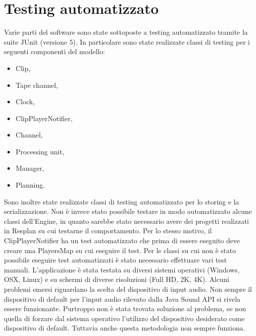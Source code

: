 \documentclass[a4paper,12pt]{report}
\begin{document}
\section{Testing automatizzato}
Varie parti del software sono state sottoposte a testing automatizzato tramite la suite JUnit (versione 5).
In particolare sono state realizzate classi di testing per i seguenti componenti del modello:
\begin{itemize}
    \item Clip,
    \item Tape channel,
    \item Clock,
    \item ClipPlayerNotifier,
    \item Channel,
    \item Processing unit,
    \item Manager,
    \item Planning.
\end{itemize}
Sono inoltre state realizzate classi di testing automatizzato per lo storing e la serializzazione.
Non è invece stato possibile testare in modo automatizzato alcune classi dell’Engine, in quanto sarebbe stato necessario avere dei progetti realizzati in Resplan su cui testarne il comportamento. 
Per lo stesso motivo, il ClipPlayerNotifier ha un test automatizzato che prima di essere eseguito deve creare una PlayersMap su cui eseguire il test.
Per le classi su cui non è stato possibile eseguire test automatizzati è stato necessario effettuare vari test manuali.
L’applicazione è stata testata su diversi sistemi operativi (Windows, OSX, Linux) e su schermi di diverse risoluzioni (Full HD, 2K, 4K).
Alcuni problemi emersi riguardano la scelta del dispositivo di input audio. Non sempre il dispositivo di default per l’input audio rilevato dalla Java Sound API si rivela essere funzionante. Purtroppo non è stata trovata soluzione al problema, se non quella di forzare dal sistema operativo l’utilizzo del dispositivo desiderato come dispositivo di default. Tuttavia anche questa metodologia non sempre funziona.
\end{document}

